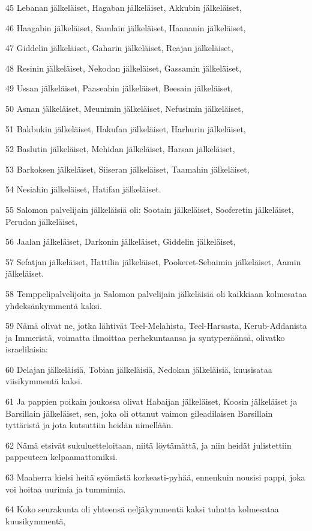 \par 45 Lebanan jälkeläiset, Hagaban jälkeläiset, Akkubin jälkeläiset,
\par 46 Haagabin jälkeläiset, Samlain jälkeläiset, Haananin jälkeläiset,
\par 47 Giddelin jälkeläiset, Gaharin jälkeläiset, Reajan jälkeläiset,
\par 48 Resinin jälkeläiset, Nekodan jälkeläiset, Gassamin jälkeläiset,
\par 49 Ussan jälkeläiset, Paaseahin jälkeläiset, Beesain jälkeläiset,
\par 50 Asnan jälkeläiset, Meunimin jälkeläiset, Nefusimin jälkeläiset,
\par 51 Bakbukin jälkeläiset, Hakufan jälkeläiset, Harhurin jälkeläiset,
\par 52 Baslutin jälkeläiset, Mehidan jälkeläiset, Harsan jälkeläiset,
\par 53 Barkoksen jälkeläiset, Siiseran jälkeläiset, Taamahin jälkeläiset,
\par 54 Nesiahin jälkeläiset, Hatifan jälkeläiset.
\par 55 Salomon palvelijain jälkeläisiä oli: Sootain jälkeläiset, Sooferetin jälkeläiset, Perudan jälkeläiset,
\par 56 Jaalan jälkeläiset, Darkonin jälkeläiset, Giddelin jälkeläiset,
\par 57 Sefatjan jälkeläiset, Hattilin jälkeläiset, Pookeret-Sebaimin jälkeläiset, Aamin jälkeläiset.
\par 58 Temppelipalvelijoita ja Salomon palvelijain jälkeläisiä oli kaikkiaan kolmesataa yhdeksänkymmentä kaksi.
\par 59 Nämä olivat ne, jotka lähtivät Teel-Melahista, Teel-Harsasta, Kerub-Addanista ja Immeristä, voimatta ilmoittaa perhekuntaansa ja syntyperäänsä, olivatko israelilaisia:
\par 60 Delajan jälkeläisiä, Tobian jälkeläisiä, Nedokan jälkeläisiä, kuusisataa viisikymmentä kaksi.
\par 61 Ja pappien poikain joukossa olivat Habaijan jälkeläiset, Koosin jälkeläiset ja Barsillain jälkeläiset, sen, joka oli ottanut vaimon gileadilaisen Barsillain tyttäristä ja jota kutsuttiin heidän nimellään.
\par 62 Nämä etsivät sukuluetteloitaan, niitä löytämättä, ja niin heidät julistettiin pappeuteen kelpaamattomiksi.
\par 63 Maaherra kielsi heitä syömästä korkeasti-pyhää, ennenkuin nousisi pappi, joka voi hoitaa uurimia ja tummimia.
\par 64 Koko seurakunta oli yhteensä neljäkymmentä kaksi tuhatta kolmesataa kuusikymmentä,
